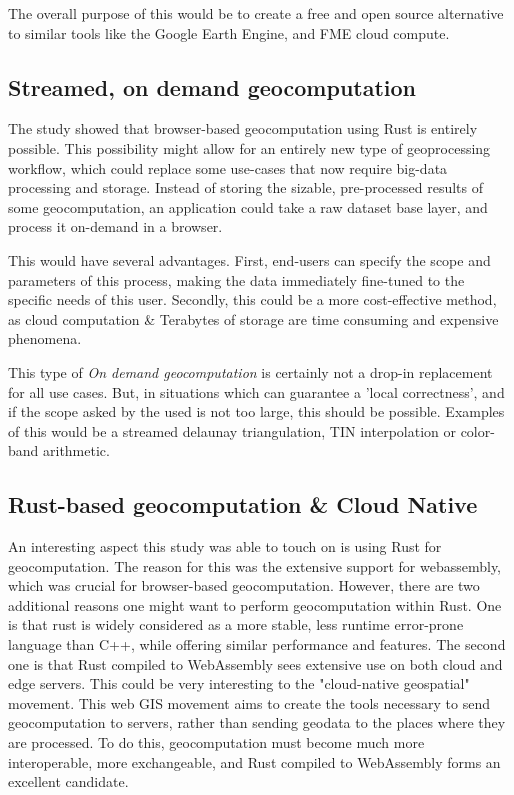 The overall purpose of this would be to create a free and open source alternative to similar tools like the Google Earth Engine, and FME cloud compute. 

\subsection{Streamed, on demand geocomputation}

The study showed that browser-based geocomputation using Rust is entirely possible. 
This possibility might allow for an entirely new type of geoprocessing workflow, which could replace some use-cases that now require big-data processing and storage.
Instead of storing the sizable, pre-processed results of some geocomputation, an application could take a raw dataset base layer, and process it on-demand in a browser.

This would have several advantages. 
First, end-users can specify the scope and parameters of this process, making the data immediately fine-tuned to the specific needs of this user. 
Secondly, this could be a more cost-effective method, as cloud computation \& Terabytes of storage are time consuming and expensive phenomena.

This type of \emph{On demand geocomputation} is certainly not a drop-in replacement for all use cases. 
But, in situations which can guarantee a 'local correctness', and if the scope asked by the used is not too large, this should be possible. 
Examples of this would be a streamed delaunay triangulation, TIN interpolation or color-band arithmetic. 

\subsection{Rust-based geocomputation \& Cloud Native}
An interesting aspect this study was able to touch on is using Rust for geocomputation.
The reason for this was the extensive support for webassembly, which was crucial for browser-based geocomputation. 
However, there are two additional reasons one might want to perform geocomputation within Rust.
One is that rust is widely considered as a more stable, less runtime error-prone language than C++, while offering similar performance and features. 
The second one is that Rust compiled to WebAssembly sees extensive use on both cloud and edge servers.  
This could be very interesting to the "cloud-native geospatial" movement. 
This web GIS movement aims to create the tools necessary to send geocomputation to servers, rather than sending geodata to the places where they are processed.
To do this, geocomputation must become much more interoperable, more exchangeable, and Rust compiled to WebAssembly forms an excellent candidate. 

